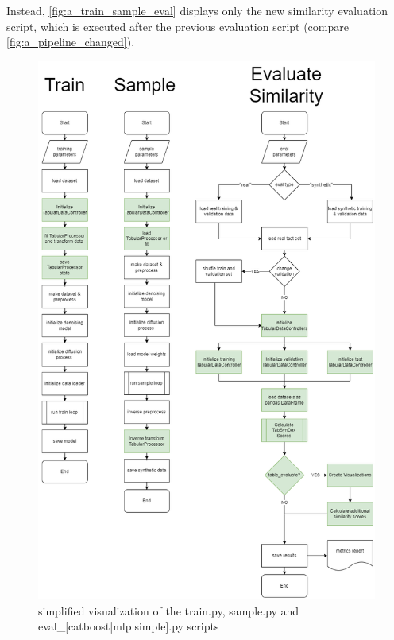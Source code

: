 Instead,  \autoref{fig:a_train_sample_eval} displays only the new similarity evaluation script, which is
executed after the previous evaluation script (compare \autoref{fig:a_pipeline_changed}).
\begin{figure}
	\centering
	\includegraphics[width=\textwidth]{images/train-sample-eval-Changed.png}
	\caption[Train, Sample, Evaluation Script Changes]{simplified visualization of the train.py, sample.py and eval\_[catboost|mlp|simple].py scripts}
	\label{fig:a_train_sample_eval}
\end{figure}
